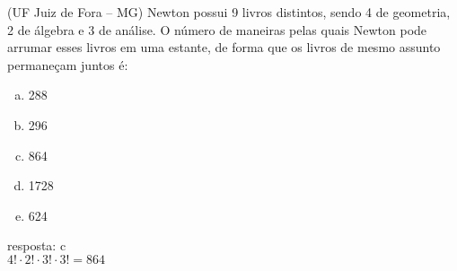 \begin{ex}
(UF Juiz de Fora – MG) Newton possui 9 livros distintos, sendo 4 de geometria, 2 de álgebra e 3 de análise. O número de maneiras pelas quais Newton pode arrumar esses livros em uma estante, de forma que os livros de mesmo assunto permaneçam juntos é:
   \begin{enumerate}[(a)]
   \item 288
   \item 296
   \item 864
   \item 1728
   \item 624
   \end{enumerate}
     \begin{sol}
        resposta: c \\
       $4!\cdot2!\cdot3!\cdot3!=864$
     \end{sol}
\end{ex}